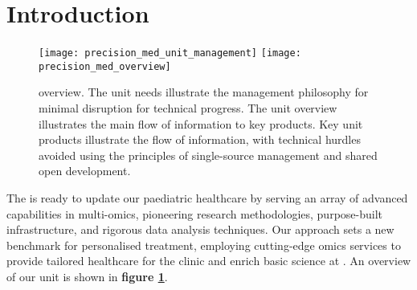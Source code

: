 \section{Introduction}
\label{intro}

\begin{figure}[h] \hspace*{0cm} 
\begin{center}
	\texttt{[image: precision\_med\_unit\_management]}
	\texttt{[image: precision\_med\_overview]}
	\caption{\pmu overview. The unit needs illustrate the management philosophy for minimal disruption for technical progress. The unit overview illustrates the main flow of information to key products. Key unit products illustrate the flow of information, with technical hurdles avoided using the principles of single-source management and shared open development.}
	\label{fig:overview}
\end{center}
\end{figure}

The \pmu is ready to update our paediatric healthcare by serving an array of advanced capabilities in multi-omics, pioneering research methodologies, purpose-built infrastructure, and rigorous data analysis techniques. 
Our approach sets a new benchmark for personalised treatment, employing cutting-edge omics services to provide tailored healthcare for the clinic and 
enrich basic science at \kispi. An overview of our unit is shown in 
\textbf{figure \ref{fig:overview}}.

